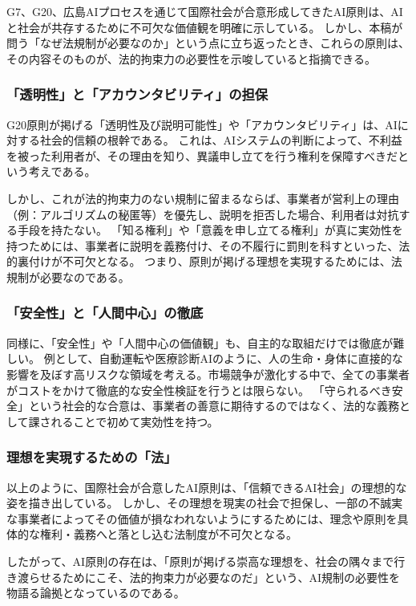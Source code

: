 G7、G20、広島AIプロセスを通じて国際社会が合意形成してきたAI原則は、AIと社会が共存するために不可欠な価値観を明確に示している。
しかし、本稿が問う「なぜ法規制が必要なのか」という点に立ち返ったとき、これらの原則は、その内容そのものが、法的拘束力の必要性を示唆していると指摘できる。

\subsubsection{「透明性」と「アカウンタビリティ」の担保}

G20原則が掲げる「透明性及び説明可能性」や「アカウンタビリティ」は、AIに対する社会的信頼の根幹である。
これは、AIシステムの判断によって、不利益を被った利用者が、その理由を知り、異議申し立てを行う権利を保障すべきだという考えである。

しかし、これが法的拘束力のない規制に留まるならば、事業者が営利上の理由（例：アルゴリズムの秘匿等）を優先し、説明を拒否した場合、利用者は対抗する手段を持たない。
「知る権利」や「意義を申し立てる権利」が真に実効性を持つためには、事業者に説明を義務付け、その不履行に罰則を科すといった、法的裏付けが不可欠となる。
つまり、原則が掲げる理想を実現するためには、法規制が必要なのである。

\subsubsection{「安全性」と「人間中心」の徹底}

同様に、「安全性」や「人間中心の価値観」も、自主的な取組だけでは徹底が難しい。
例として、自動運転や医療診断AIのように、人の生命・身体に直接的な影響を及ぼす高リスクな領域を考える。市場競争が激化する中で、全ての事業者がコストをかけて徹底的な安全性検証を行うとは限らない。
「守られるべき安全」という社会的な合意は、事業者の善意に期待するのではなく、法的な義務として課されることで初めて実効性を持つ。

\subsubsection{理想を実現するための「法」}

以上のように、国際社会が合意したAI原則は、「信頼できるAI社会」の理想的な姿を描き出している。
しかし、その理想を現実の社会で担保し、一部の不誠実な事業者によってその価値が損なわれないようにするためには、理念や原則を具体的な権利・義務へと落とし込む法制度が不可欠となる。

したがって、AI原則の存在は、「原則が掲げる崇高な理想を、社会の隅々まで行き渡らせるためにこそ、法的拘束力が必要なのだ」という、AI規制の必要性を物語る論拠となっているのである。


